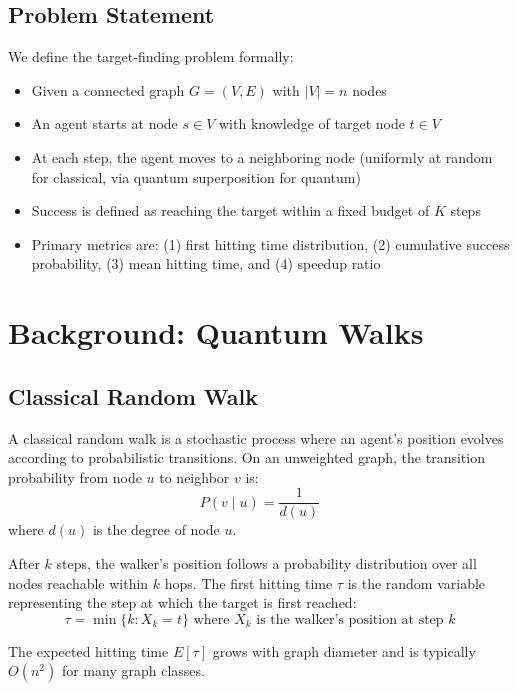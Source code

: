 \documentclass[12pt,a4paper]{article}
\begin{document}
\subsection{Problem Statement}

We define the target-finding problem formally:
\begin{itemize}
    \item Given a connected graph $G = (V, E)$ with $|V| = n$ nodes
    \item An agent starts at node $s \in V$ with knowledge of target node $t \in V$
    \item At each step, the agent moves to a neighboring node (uniformly at random for classical, via quantum superposition for quantum)
    \item Success is defined as reaching the target within a fixed budget of $K$ steps
    \item Primary metrics are: (1) first hitting time distribution, (2) cumulative success probability, (3) mean hitting time, and (4) speedup ratio
\end{itemize}

\section{Background: Quantum Walks}

\subsection{Classical Random Walk}

A classical random walk is a stochastic process where an agent's position evolves according to probabilistic transitions. On an unweighted graph, the transition probability from node $u$ to neighbor $v$ is:
\begin{equation}
P(v \mid u) = \frac{1}{d(u)}
\end{equation}
where $d(u)$ is the degree of node $u$.

After $k$ steps, the walker's position follows a probability distribution over all nodes reachable within $k$ hops. The first hitting time $\tau$ is the random variable representing the step at which the target is first reached:
\begin{equation}
\tau = \min\{k : X_k = t\} \text{ where } X_k \text{ is the walker's position at step } k
\end{equation}

The expected hitting time $E[\tau]$ grows with graph diameter and is typically $O(n^2)$ for many graph classes.
\end{document}
